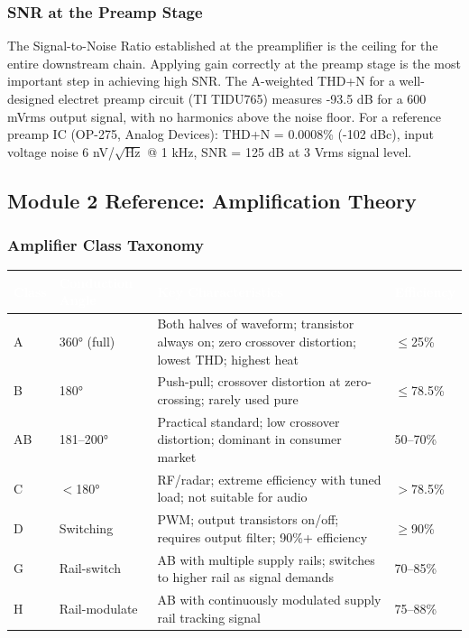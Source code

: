 \documentclass[11pt,letterpaper]{article}
\newcommand{\tableheader}[1]{\textbf{\sffamily\textcolor{white}{#1}}}
\begin{document}
\subsubsection{SNR at the Preamp Stage}

The Signal-to-Noise Ratio established at the preamplifier is the ceiling for the entire downstream chain. Applying gain correctly at the preamp stage is the most important step in achieving high SNR. The A-weighted THD+N for a well-designed electret preamp circuit (TI TIDU765) measures -93.5 dB for a 600 mVrms output signal, with no harmonics above the noise floor. For a reference preamp IC (OP-275, Analog Devices): THD+N = 0.0008\% (-102 dBc), input voltage noise 6 nV/$\sqrt{\text{Hz}}$ @ 1 kHz, SNR = 125 dB at 3 Vrms signal level.

\subsection{Module 2 Reference: Amplification Theory}

\subsubsection{Amplifier Class Taxonomy}

\begin{center}
\begin{tabularx}{\textwidth}{L{2cm}L{2.5cm}XL{2cm}}
\toprule
{}
\tableheader{Class} & \tableheader{Conduction Angle} & \tableheader{Key Characteristics} & \tableheader{Efficiency} \\
\midrule
A & 360° (full) & Both halves of waveform; transistor always on; zero crossover distortion; lowest THD; highest heat & $\leq$25\% \\
B & 180° & Push-pull; crossover distortion at zero-crossing; rarely used pure & $\leq$78.5\% \\
AB & 181--200° & Practical standard; low crossover distortion; dominant in consumer market & 50--70\% \\
C & $<$180° & RF/radar; extreme efficiency with tuned load; not suitable for audio & $>$78.5\% \\
D & Switching & PWM; output transistors on/off; requires output filter; 90\%+ efficiency & $\geq$90\% \\
G & Rail-switch & AB with multiple supply rails; switches to higher rail as signal demands & 70--85\% \\
H & Rail-modulate & AB with continuously modulated supply rail tracking signal & 75--88\% \\
\bottomrule
\end{tabularx}
\end{center}
\end{document}
